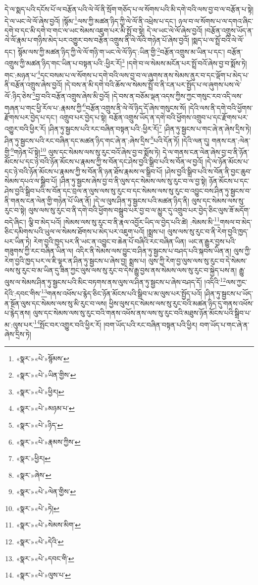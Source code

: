 དེ་ལ་སྨད་པའི་དངོས་པོ་ལ་བརྩོན་པའི་ལེ་ལོ་ནི་སྲོག་གཅོད་པ་ལ་སོགས་པའི་མི་དགེ་བའི་ལས་བྱ་བ་ལ་བརྩོན་པ་སྟེ། དེ་ལ་ཡང་ལེ་ལོ་ཞེས་བྱའོ། །སྙོམ་\footnote{«སྣར་»«པེ་»སྙོམས་}ལས་ཀྱི་མཚན་ཉིད་ཀྱི་ལེ་ལོ་ནི་འཕྲེས་པ་དང་། ཉལ་བ་ལ་སོགས་པ་ལ་དགའ་ཞིང་དགེ་བ་དང་མི་དགེ་བ་གང་ལ་ཡང་སེམས་འཇུག་པར་མི་སྤྲོ་བ་སྟེ། དེ་ལ་ཡང་ལེ་ལོ་ཞེས་བྱའོ། །བརྩོན་འགྲུས་ཡོད་ན་ལེ་ལོ་རྣམ་པ་གཉིས་མེད་པར་འགྱུར་བས་བརྩོན་འགྲུས་ནི་ལེ་ལོའི་གཉེན་པོ་ཞེས་བྱའོ། །སྨད་པ་ལ་སྤྲོ་བའི་ལེ་ལོ་དང་། སྙོམ་ལས་ཀྱི་མཚན་ཉིད་ཀྱི་ལེ་ལོ་གཉི་ག་ཡང་ལེ་ལོ་ཉིད་:ཡིན་གྱི་\footnote{«སྣར་»«པེ་»ཡིན་གྱིས་}བརྩོན་འགྲུས་མ་ཡིན་པ་དང་། བརྩོན་འགྲུས་ཀྱི་མཚན་ཉིད་གང་ཡིན་པ་བསྟན་པའི་:ཕྱིར་རོ།\footnote{«སྣར་»«པེ་»ཕྱིར།} །དགེ་བ་ལ་སེམས་མངོན་པར་སྤྲོ་བའོ་ཞེས་བྱ་བ་སྨོས་ཏེ། གང་:མཉན་པ་\footnote{«སྣར་»«པེ་»མཉམ་པ་}དང་བསམ་པ་ལ་སོགས་པ་དགེ་བའི་ལས་བྱ་བ་ལ་ཞུགས་ནས་སེམས་ནུར་བ་དང་ལྡོག་པ་མེད་པ་ནི་བརྩོན་འགྲུས་ཞེས་བྱའོ། །དེ་བས་ན་མི་དགེ་བའི་ཆོས་ལ་སེམས་སྤྲོ་བ་ནི་ངན་པར་སྤྱོད་པ་ལ་ཞུགས་པས་ལེ་ལོ་:ཉིད་ཅེས་\footnote{«སྣར་»«པེ་»ཉིད་}བྱ་བའི་བརྩོན་འགྲུས་ཞེས་མི་བྱའོ། །དེ་བས་ན་བཅོམ་ལྡན་འདས་ཀྱིས་ཀྱང་གསུང་རབ་འདི་ལས་གཞན་པ་གང་ཕྱི་རོལ་པ་:རྣམས་ཀྱི་\footnote{«སྣར་»«པེ་»རྣམས་ཀྱིས་}བརྩོན་འགྲུས་ནི་ལེ་ལོ་ཉིད་དོ་ཞེས་གསུངས་སོ། །དེའི་ལས་ནི་དགེ་བའི་ཕྱོགས་རྫོགས་པར་བྱེད་པ་དང་། འགྲུབ་པར་བྱེད་པ་སྟེ། བརྩོན་འགྲུས་ཡོད་ན་དགེ་བའི་ཕྱོགས་འགྲུབ་པ་དང་རྫོགས་པར་འགྱུར་བའི་ཕྱིར་རོ། །ཤིན་ཏུ་སྦྱངས་པའི་རང་བཞིན་བསྟན་པའི་:ཕྱིར་རོ།\footnote{«སྣར་»ཕྱིར།} །ཤིན་ཏུ་སྦྱངས་པ་གང་ཞེ་ན་ཞེས་དྲིས་ཏེ། ཤིན་ཏུ་སྦྱངས་པའི་རང་བཞིན་དང་མཚན་ཉིད་གང་ཞེ་ན་:ཞེས་དྲིས་\footnote{«སྣར་»ཞེས་}པའི་དོན་ཏོ། །དེའི་ལན་དུ། གནས་ངན་:ལེན་གྱི་\footnote{«སྣར་»«པེ་»ལེན་གྱིས་}གཉེན་པོ་སྟེ།\footnote{«སྣར་»«པེ་»ཏེ།} ལུས་དང་སེམས་ལས་སུ་རུང་བའོ་ཞེས་བྱ་བ་སྨོས་ཏེ། དེ་ལ་གནས་ངན་ལེན་ཞེས་བྱ་བ་ནི་ཉོན་མོངས་པ་དང་ཉེ་བའི་ཉོན་མོངས་པ་རྣམས་ཀྱི་ས་བོན་དང་ཤེས་བྱའི་སྒྲིབ་པའི་ས་བོན་ལ་བྱའོ། །དེ་ལ་ཉོན་མོངས་པ་དང་ཉེ་བའི་ཉོན་མོངས་པ་རྣམས་ཀྱི་ས་བོན་ནི་ཉན་ཐོས་རྣམས་ལ་སྒྲིབ་པོ། །ཤེས་བྱའི་སྒྲིབ་པའི་ས་བོན་ནི་བྱང་ཆུབ་སེམས་དཔའ་ལ་སྒྲིབ་པོ། །ཤིན་ཏུ་སྦྱངས་ཞེས་བྱ་བ་ནི་ལུས་དང་སེམས་ལས་སུ་རུང་བ་ལ་བྱ་སྟེ། ཉོན་མོངས་པ་དང་ཤེས་བྱའི་སྒྲིབ་པའི་ས་བོན་དང་བྲལ་ན་ལུས་ལས་སུ་རུང་བ་དང་སེམས་ལས་སུ་རུང་བ་འབྱུང་བས་ཤིན་ཏུ་སྦྱངས་བ་ནི་གནས་ངན་ལེན་གྱི་གཉེན་པོ་ཡིན་ནོ། །དེ་ལ་ལུས་ཤིན་ཏུ་སྦྱངས་པའི་མཚན་ཉིད་ནི། ལུས་དང་སེམས་ལས་སུ་རུང་བ་སྟེ། ལུས་ལས་སུ་རུང་བ་ནི་དགེ་བའི་ཕྱོགས་བསྒྲུབ་པར་བྱ་བ་ལ་མྱུར་དུ་འགྲུབ་པར་བྱེད་ཅིང་ལུས་ཟོ་མདོག་བདེ་ཞིང་། ལྕི་བ་མེད་པའོ། །སེམས་ལས་སུ་རུང་བ་ནི་རྣལ་འབྱོར་ཡིད་ལ་བྱེད་པའི་ཚེ། :སེམས་མི་\footnote{«སྣར་»«པེ་»སེམས་མིག་}གསལ་བ་མེད་ཅིང་དམིགས་པའི་ཡུལ་ལ་སེམས་ཐོགས་པ་མེད་པར་འཇུག་པའོ། །སྨྲས་པ། ལུས་ལས་སུ་རུང་བ་ནི་རེག་བྱའི་ཁྱད་པར་ཡིན་ཏེ། རེག་བྱའི་ཁྱད་པར་ནི་ཡང་ན་འབྱུང་བ་ཆེན་པོ་བཞིའི་རང་བཞིན་ཡིན། ཡང་ན་རྒྱུར་བྱས་པའི་གཟུགས་ཀྱི་རང་བཞིན་ཡིན་ལ། འདིར་ནི་སེམས་ལས་བྱུང་བ་ཤིན་ཏུ་སྦྱངས་པ་བཤད་པའི་སྐབས་ཡིན་ན། ལུས་ཀྱི་རེག་བྱའི་ཁྱད་པར་ལ་ཇི་ལྟར་ན་ཤིན་ཏུ་སྦྱངས་པ་ཞེས་བྱ། སྨྲས་པ། ལུས་ཀྱི་རེག་བྱ་ལུས་ལས་སུ་རུང་བ་དེ་སེམས་ལས་སུ་རུང་བ་མ་ཡིན་དུ་ཟིན་ཀྱང་ལུས་ལས་སུ་རུང་བ་དེས་རྒྱུ་བྱས་ནས་སེམས་ལས་སུ་རུང་བ་སྐྱེད་པས་ན། རྒྱུ་ལུས་ལ་སེམས་ཤིན་ཏུ་སྦྱངས་པའི་མིང་བཏགས་ནས་ལུས་ལ་ཤིན་ཏུ་སྦྱངས་པ་ཞེས་བཤད་དོ། །འདིའི་\footnote{«སྣར་»«པེ་»དེའི་}ལས་ཀྱང་དེའི་:དབང་གིས་\footnote{«སྣར་»«པེ་»དབང་གི་}གནས་འཕོས་པ་རྙེད་ཅིང་ཉོན་མོངས་པའི་སྒྲིབ་པ་མ་ལུས་པར་སྤྱོད་པའོ། །ཤིན་ཏུ་སྦྱངས་པ་ཡོད་ན་སྔོན་ལུས་དང་སེམས་ལས་སུ་མི་རུང་བ་ལས། ཕྱིས་ལུས་དང་སེམས་ལས་སུ་རུང་བའི་མཚན་ཉིད་དུ་གནས་འཕོས་པ་རྙེད་ནས། ལུས་དང་སེམས་ལས་སུ་རུང་བའི་གནས་འཕོས་ནས་ལས་སུ་རུང་བའི་མཐུས་ཉོན་མོངས་པའི་སྒྲིབ་པ་མ་:ལུས་པར་\footnote{«སྣར་»«པེ་»ལུས་པ་}སྤོང་བར་འགྱུར་བའི་ཕྱིར་རོ། །བག་ཡོད་པའི་རང་བཞིན་བསྟན་པའི་ཕྱིར། བག་ཡོད་པ་གང་ཞེ་ན་ཞེས་དྲིས་ཏེ། 